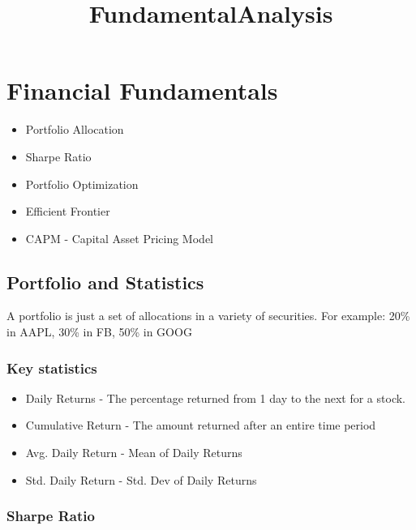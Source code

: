 \documentclass[11pt]{article}
\title{FundamentalAnalysis}
\providecommand{\tightlist}{%
      \setlength{\itemsep}{0pt}\setlength{\parskip}{0pt}}
\begin{document}
    
    
    \maketitle
    
    

    
    \section{Financial Fundamentals}\label{financial-fundamentals}

\begin{itemize}
\tightlist
\item
  Portfolio Allocation
\item
  Sharpe Ratio
\item
  Portfolio Optimization
\item
  Efficient Frontier
\item
  CAPM - Capital Asset Pricing Model
\end{itemize}

    \subsection{Portfolio and Statistics}\label{portfolio-and-statistics}

A portfolio is just a set of allocations in a variety of securities. For
example: 20\% in AAPL, 30\% in FB, 50\% in GOOG

\subsubsection{Key statistics}\label{key-statistics}

\begin{itemize}
\tightlist
\item
  Daily Returns - The percentage returned from 1 day to the next for a
  stock.
\item
  Cumulative Return - The amount returned after an entire time period
\item
  Avg. Daily Return - Mean of Daily Returns
\item
  Std. Daily Return - Std. Dev of Daily Returns
\end{itemize}

\subsubsection{Sharpe Ratio}\label{sharpe-ratio}
\end{document}
